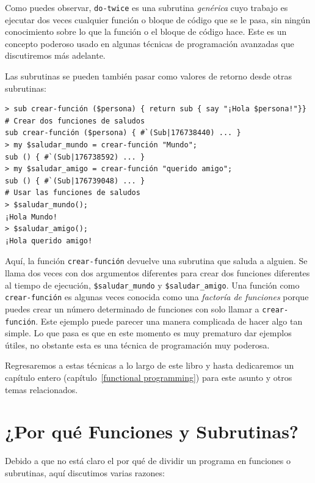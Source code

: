 Como puedes observar, \verb|do-twice| es una subrutina \emph{genérica}
cuyo trabajo es ejecutar dos veces cualquier función o bloque
de código que se le pasa, sin ningún conocimiento sobre lo que la 
función o el bloque de código hace. Este es un concepto poderoso
usado en algunas técnicas de programación avanzadas que discutiremos
más adelante.

Las subrutinas se pueden también pasar como valores de
retorno desde otras subrutinas:

\begin{verbatim}
> sub crear-función ($persona) { return sub { say "¡Hola $persona!"}}
# Crear dos funciones de saludos
sub crear-función ($persona) { #`(Sub|176738440) ... }
> my $saludar_mundo = crear-función "Mundo";
sub () { #`(Sub|176738592) ... }
> my $saludar_amigo = crear-función "querido amigo";
sub () { #`(Sub|176739048) ... }
# Usar las funciones de saludos
> $saludar_mundo();
¡Hola Mundo!
> $saludar_amigo();
¡Hola querido amigo!
\end{verbatim} 

Aquí, la función \verb|crear-función| devuelve una subrutina que saluda
a alguien. Se llama dos veces con dos argumentos diferentes para crear
dos funciones diferentes al tiempo de ejecución, \verb|$saludar_mundo|
y \verb|$saludar_amigo|. Una función como \verb|crear-función| es algunas
veces conocida como una \emph{factoría de funciones} porque puedes crear 
un número determinado de funciones con solo llamar a \verb|crear-función|. Este 
ejemplo puede parecer una manera complicada de hacer algo tan simple. 
Lo que pasa es que en este momento es muy prematuro dar ejemplos útiles,
no obstante esta es una técnica de programación muy poderosa.

Regresaremos a estas técnicas a lo largo de este libro y hasta dedicaremos
un capítulo entero (capítulo~\ref{functional programming}) 
para este asunto y otros temas relacionados.


\section{¿Por qué Funciones y Subrutinas?}

Debido a que no está claro el por qué de dividir un programa
en funciones o subrutinas, aquí discutimos varias razones:

